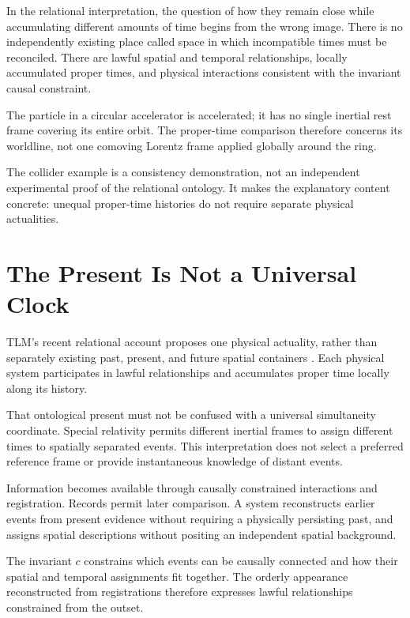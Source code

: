 \documentclass[11pt]{article}
\begin{document}
In the relational interpretation, the question of how they remain close while accumulating different amounts of time begins from the wrong image. There is no independently existing place called space in which incompatible times must be reconciled. There are lawful spatial and temporal relationships, locally accumulated proper times, and physical interactions consistent with the invariant causal constraint.

The particle in a circular accelerator is accelerated; it has no single inertial rest frame covering its entire orbit. The proper-time comparison therefore concerns its worldline, not one comoving Lorentz frame applied globally around the ring.

The collider example is a consistency demonstration, not an independent experimental proof of the relational ontology. It makes the explanatory content concrete: unequal proper-time histories do not require separate physical actualities.

\section{The Present Is Not a Universal Clock}

TLM's recent relational account proposes one physical actuality, rather than separately existing past, present, and future spatial containers \cite{mckinleybox2026,mckinleymotion2026}. Each physical system participates in lawful relationships and accumulates proper time locally along its history.

That ontological present must not be confused with a universal simultaneity coordinate. Special relativity permits different inertial frames to assign different times to spatially separated events. This interpretation does not select a preferred reference frame or provide instantaneous knowledge of distant events.

Information becomes available through causally constrained interactions and registration. Records permit later comparison. A system reconstructs earlier events from present evidence without requiring a physically persisting past, and assigns spatial descriptions without positing an independent spatial background.

The invariant $c$ constrains which events can be causally connected and how their spatial and temporal assignments fit together. The orderly appearance reconstructed from registrations therefore expresses lawful relationships constrained from the outset.
\end{document}
